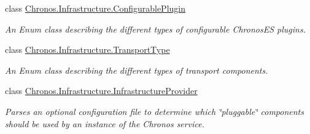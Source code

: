 \begin{DoxyCompactItemize}
class \hyperlink{classChronos_1_1Infrastructure_1_1ConfigurablePlugin}{Chronos.\+Infrastructure.\+Configurable\+Plugin}
\begin{DoxyCompactList}\small\item\em An Enum class describing the different types of configurable Chronos\+ES plugins. \end{DoxyCompactList}\item 
class \hyperlink{classChronos_1_1Infrastructure_1_1TransportType}{Chronos.\+Infrastructure.\+Transport\+Type}
\begin{DoxyCompactList}\small\item\em An Enum class describing the different types of transport components. \end{DoxyCompactList}\item 
class \hyperlink{classChronos_1_1Infrastructure_1_1InfrastructureProvider}{Chronos.\+Infrastructure.\+Infrastructure\+Provider}
\begin{DoxyCompactList}\small\item\em Parses an optional configuration file to determine which \char`\"{}pluggable\char`\"{} components should be used by an instance of the Chronos service. \end{DoxyCompactList}\end{DoxyCompactItemize}
